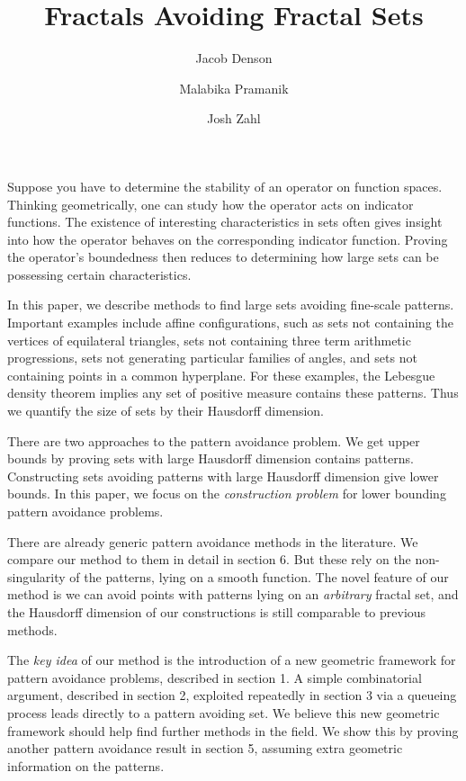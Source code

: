 \documentclass{article}
\title{Fractals Avoiding Fractal Sets}
\author{Jacob Denson\\ \and Malabika Pramanik\\ \and Josh Zahl}
\theoremstyle{plain}
\theoremstyle{plain}
\begin{document}
\maketitle

\begin{multicols}{2}

\begin{abstract}
	\blindtext[1]
\end{abstract}

Suppose you have to determine the stability of an operator on function spaces. Thinking geometrically, one can study how the operator acts on indicator functions. The existence of interesting characteristics in sets often gives insight into how the operator behaves on the corresponding indicator function. Proving the operator's boundedness then reduces to determining how large sets can be possessing certain characteristics.


In this paper, we describe methods to find large sets avoiding fine-scale patterns. Important examples include affine configurations, such as sets not containing the vertices of equilateral triangles, sets not containing three term arithmetic progressions, sets not generating particular families of angles, and sets not containing points in a common hyperplane. For these examples, the Lebesgue density theorem implies any set of positive measure contains these patterns. Thus we quantify the size of sets by their Hausdorff dimension.

There are two approaches to the pattern avoidance problem. We get upper bounds by proving sets with large Hausdorff dimension contains patterns. Constructing sets avoiding patterns with large Hausdorff dimension give lower bounds. In this paper, we focus on the {\it construction problem} for lower bounding pattern avoidance problems.

There are already generic pattern avoidance methods in the literature. We compare our method to them in detail in section 6. But these rely on the non-singularity of the patterns, lying on a smooth function. The novel feature of our method is we can avoid points with patterns lying on an {\it arbitrary} fractal set, and the Hausdorff dimension of our constructions is still comparable to previous methods.

The {\it key idea} of our method is the introduction of a new geometric framework for pattern avoidance problems, described in section 1. A simple combinatorial argument, described in section 2, exploited repeatedly in section 3 via a queueing process leads directly to a pattern avoiding set. We believe this new geometric framework should help find further methods in the field. We show this by proving another pattern avoidance result in section 5, assuming extra geometric information on the patterns.


\end{multicols}
\end{document}
